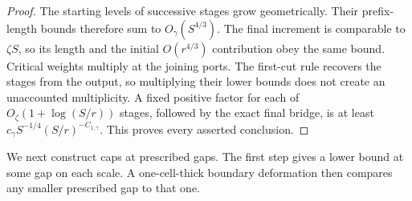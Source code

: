 \documentclass[11pt]{article}
\numberwithin{equation}{section}
\theoremstyle{definition}\newtheorem{definition}[theorem]{Definition}
\theoremstyle{remark}\newtheorem{remark}[theorem]{Remark}
\begin{document}
\begin{proof}
The starting levels of successive stages grow geometrically.
Their prefix-length bounds therefore sum to \(O_\gamma(S^{4/3})\).
The final increment is comparable to \(\zeta S\), so its length and
the initial \(O(r^{4/3})\) contribution obey the same bound.
Critical weights multiply at the joining ports. The first-cut rule
recovers the stages from the output, so multiplying their lower bounds
does not create an unaccounted multiplicity. A fixed positive factor
for each of \(O_\zeta(1+\log(S/r))\) stages, followed by the exact
final bridge, is at least
\(c_\gamma S^{-1/4}(S/r)^{-C_{1,\gamma}}\).
This proves every asserted conclusion.
\end{proof}

We next construct caps at prescribed gaps.  The first step gives a
lower bound at some gap on each scale.  A one-cell-thick boundary
deformation then compares any smaller prescribed gap to that one.
\end{document}
